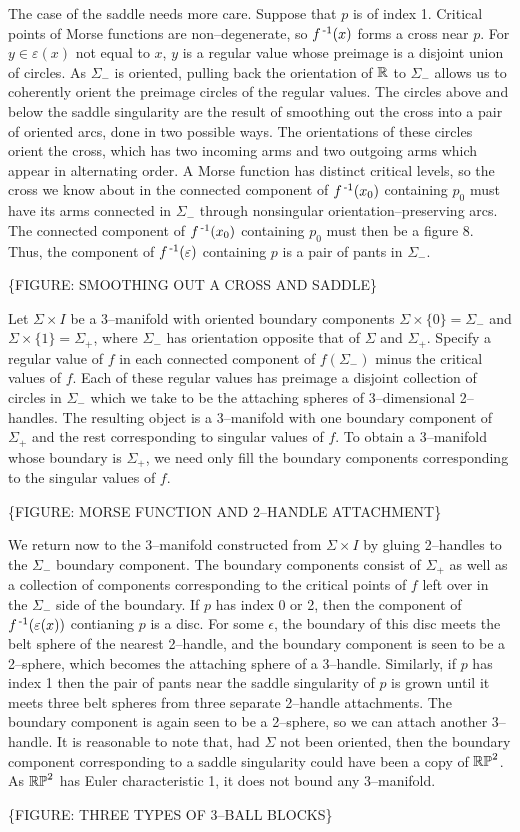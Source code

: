 The case of the saddle needs more care.
Suppose that $p$ is of index 1.
Critical points of Morse functions are non--degenerate, so $f^{\,\text{-}1} (x)$ forms a cross near $p$.
For $y\in\varepsilon(x)$ not equal to $x$, $y$ is a regular value whose preimage is a disjoint union of circles.
As $\Sigma_-$ is oriented, pulling back the orientation of $\mathbb{R}$ to $\Sigma_-$ allows us to coherently orient the preimage circles of the regular values.
The circles above and below the saddle singularity are the result of smoothing out the cross into a pair of oriented arcs, done in two possible ways.
The orientations of these circles orient the cross, which has two incoming arms and two outgoing arms which appear in alternating order.
A Morse function has distinct critical levels, so the cross we know about in the connected component of $f^{\,\text{-}1}(x_0)$ containing $p_0$ must have its arms connected in $\Sigma_-$ through nonsingular orientation--preserving arcs.
The connected component of $f^{\,\text{-}1}(x_0)$ containing $p_0$ must then be a figure 8.
Thus, the component of $f^{\,\text{-}1}(\varepsilon)$ containing $p$ is a pair of pants in $\Sigma_-$.

\{FIGURE: SMOOTHING OUT A CROSS AND SADDLE\}


Let $\Sigma\times I$ be a 3--manifold with oriented boundary components $\Sigma\times\{0\}=\Sigma_-$ and $\Sigma\times\{1\}=\Sigma_+$, where $\Sigma_-$ has orientation opposite that of $\Sigma$ and $\Sigma_+$.
Specify a regular value of $f$ in each connected component of $f(\Sigma_-)$ minus the critical values of $f$.
Each of these regular values has preimage a disjoint collection of circles in $\Sigma_-$ which we take to be the attaching spheres of 3--dimensional 2--handles. 
The resulting object is a 3--manifold with one boundary component of $\Sigma_+$ and the rest corresponding to singular values of $f$.
To obtain a 3--manifold whose boundary is $\Sigma_+$, we need only fill the boundary components corresponding to the singular values of $f$.

\{FIGURE: MORSE FUNCTION AND 2--HANDLE ATTACHMENT\}



We return now to the 3--manifold constructed from $\Sigma\times I$ by gluing 2--handles to the $\Sigma_-$ boundary component.
The boundary components consist of $\Sigma_+$ as well as a collection of components corresponding to the critical points of $f$ left over in the $\Sigma_-$ side of the boundary.
If $p$ has index 0 or 2, then the component of $f^{\,\text{-}1}(\varepsilon(x))$ contianing $p$ is a disc.
For some $\epsilon$, the boundary of this disc meets the belt sphere of the nearest 2--handle, and the boundary component is seen to be a 2--sphere, which becomes the attaching sphere of a 3--handle.
Similarly, if $p$ has index 1 then the pair of pants near the saddle singularity of $p$ is grown until it meets three belt spheres from three separate 2--handle attachments.
The boundary component is again seen to be a 2--sphere, so we can attach another 3--handle.
It is reasonable to note that, had $\Sigma$ not been oriented, then the boundary component corresponding to a saddle singularity could have been a copy of $\mathbb{RP}^2$.
As $\mathbb{RP}^2$ has Euler characteristic 1, it does not bound any 3--manifold.

\{FIGURE: THREE TYPES OF 3--BALL BLOCKS\}
